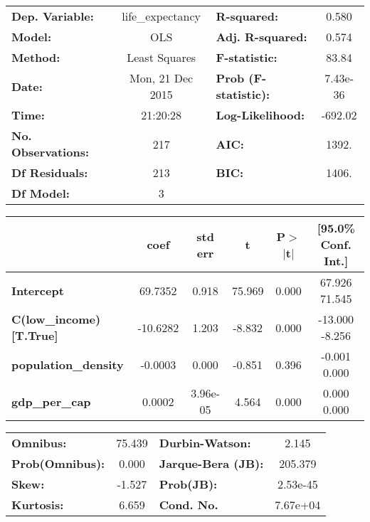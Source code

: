\begin{center}
\begin{tabular}{lclc}
\toprule
\textbf{Dep. Variable:}        & life_expectancy  & \textbf{  R-squared:         } &     0.580   \\
\textbf{Model:}                &       OLS        & \textbf{  Adj. R-squared:    } &     0.574   \\
\textbf{Method:}               &  Least Squares   & \textbf{  F-statistic:       } &     83.84   \\
\textbf{Date:}                 & Mon, 21 Dec 2015 & \textbf{  Prob (F-statistic):} &  7.43e-36   \\
\textbf{Time:}                 &     21:20:28     & \textbf{  Log-Likelihood:    } &   -692.02   \\
\textbf{No. Observations:}     &         217      & \textbf{  AIC:               } &     1392.   \\
\textbf{Df Residuals:}         &         213      & \textbf{  BIC:               } &     1406.   \\
\textbf{Df Model:}             &           3      & \textbf{                     } &             \\
\bottomrule
\end{tabular}
\begin{tabular}{lccccc}
                               & \textbf{coef} & \textbf{std err} & \textbf{t} & \textbf{P$>$$|$t$|$} & \textbf{[95.0\% Conf. Int.]}  \\
\midrule
\textbf{Intercept}             &      69.7352  &        0.918     &    75.969  &         0.000        &        67.926    71.545       \\
\textbf{C(low_income)[T.True]} &     -10.6282  &        1.203     &    -8.832  &         0.000        &       -13.000    -8.256       \\
\textbf{population_density}    &      -0.0003  &        0.000     &    -0.851  &         0.396        &        -0.001     0.000       \\
\textbf{gdp_per_cap}           &       0.0002  &     3.96e-05     &     4.564  &         0.000        &         0.000     0.000       \\
\bottomrule
\end{tabular}
\begin{tabular}{lclc}
\textbf{Omnibus:}       & 75.439 & \textbf{  Durbin-Watson:     } &    2.145  \\
\textbf{Prob(Omnibus):} &  0.000 & \textbf{  Jarque-Bera (JB):  } &  205.379  \\
\textbf{Skew:}          & -1.527 & \textbf{  Prob(JB):          } & 2.53e-45  \\
\textbf{Kurtosis:}      &  6.659 & \textbf{  Cond. No.          } & 7.67e+04  \\
\bottomrule
\end{tabular}
\end{center}